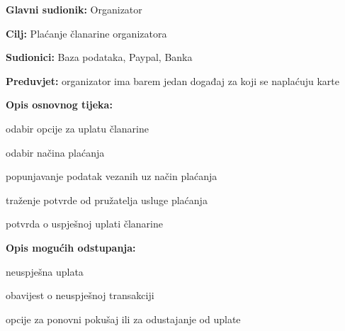 					\noindent {}
					\begin{packed_item}
	
						\item \textbf{Glavni sudionik: }Organizator
						\item  \textbf{Cilj:} Plaćanje članarine organizatora
						\item  \textbf{Sudionici:} Baza podataka, Paypal, Banka
						\item  \textbf{Preduvjet:} organizator ima barem jedan događaj za koji se naplaćuju karte
						\item  \textbf{Opis osnovnog tijeka:}
						
						\item[] \begin{packed_enum}
	
							\item odabir opcije za uplatu članarine
							\item odabir načina plaćanja 
							\item popunjavanje podatak vezanih uz način plaćanja
							\item traženje potvrde od pružatelja usluge plaćanja
							\item potvrda o uspješnoj uplati članarine
							
						\end{packed_enum}
						
						\item  \textbf{Opis mogućih odstupanja:}
						
						\item[] \begin{packed_item}
	
							\item[2.a] neuspješna uplata
							\item[] \begin{packed_enum}
								
								\item obavijest o neuspješnoj transakciji
								\item opcije za ponovni pokušaj ili za odustajanje od uplate
								
							\end{packed_enum}
							
						\end{packed_item}
							
					\end{packed_item}
					
